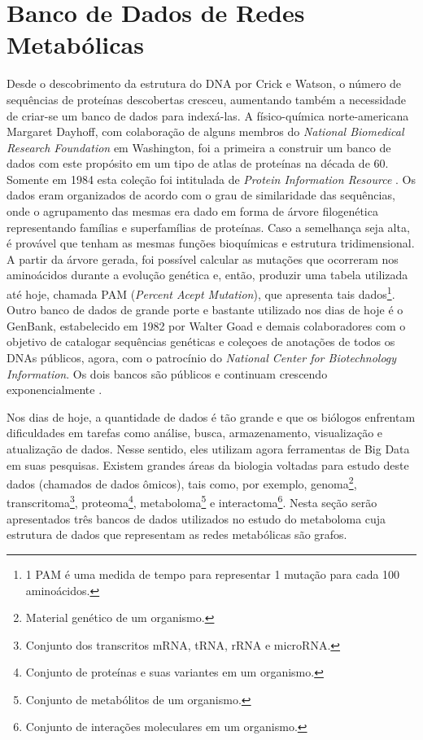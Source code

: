 
\section{Banco de Dados de Redes Metabólicas}



\indent Desde o descobrimento da estrutura do DNA por Crick e Watson, o número de sequências de proteínas descobertas cresceu, aumentando também a necessidade de criar-se um banco de dados para indexá-las. A físico-química norte-americana Margaret Dayhoff, com colaboração de alguns membros do \textit{National Biomedical Research Foundation} em Washington, foi a primeira a construir um banco de dados com este propósito em um tipo de atlas de proteínas na década de 60. Somente em 1984 esta coleção foi intitulada de \textit{Protein Information Resource} \cite{mount01}. Os dados eram organizados de acordo com o grau de similaridade das sequências, onde o agrupamento das mesmas era dado em forma de árvore filogenética representando famílias e superfamílias de proteínas. Caso a semelhança seja alta, é provável que tenham as mesmas funções bioquímicas e estrutura tridimensional. A partir da árvore gerada, foi possível calcular as mutações que ocorreram nos aminoácidos durante a evolução genética e, então, produzir uma tabela utilizada até hoje, chamada PAM (\textit{Percent Acept Mutation}), que apresenta tais dados\footnote{1 PAM é uma medida de tempo para representar 1 mutação para cada 100 aminoácidos.}. Outro banco de dados de grande porte e bastante utilizado nos dias de hoje é o GenBank, estabelecido em 1982 por Walter Goad e demais colaboradores com o objetivo de catalogar sequências genéticas e coleçoes de anotações de todos os DNAs públicos, agora, com o patrocínio do \textit{National Center for Biotechnology Information}. Os dois bancos são públicos e continuam crescendo exponencialmente \cite{mount01}. 


\indent Nos dias de hoje, a quantidade de dados é tão grande e  que os biólogos enfrentam dificuldades em tarefas como análise, busca, armazenamento, visualização e atualização de dados. Nesse sentido, eles utilizam agora ferramentas de Big Data em suas pesquisas. Existem grandes áreas da biologia voltadas para estudo deste dados (chamados de dados ômicos), tais como, por exemplo, genoma\footnote{Material genético de um organismo.}, transcritoma\footnote{Conjunto dos transcritos mRNA, tRNA, rRNA e microRNA.}, proteoma\footnote{Conjunto de proteínas e suas variantes em um organismo.}, metaboloma\footnote{Conjunto de metabólitos de um organismo.} e interactoma\footnote{Conjunto de interações moleculares em um organismo.}. Nesta seção serão apresentados três bancos de dados utilizados no estudo do metaboloma cuja estrutura de dados que representam as redes metabólicas são grafos.

